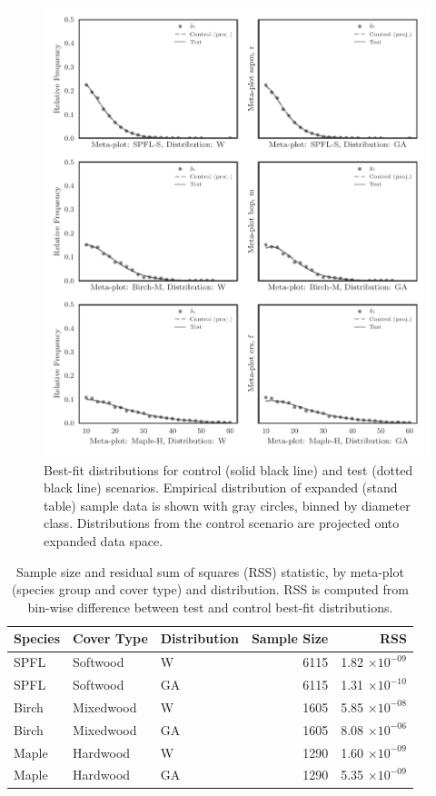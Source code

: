 \documentclass{foresj}
\begin{document}
\clearpage

\begin{figure}[h!]
  \centering
  \includegraphics[width=1.0\textwidth]{results}
  \caption{Best-fit distributions for control (solid black line) and test (dotted black line) scenarios. Empirical distribution of expanded (stand table) sample data is shown with gray circles, binned by diameter class. Distributions from the control scenario are projected onto expanded data space.}
  \label{fig:results}
\end{figure}

\begin{table}[h!]
\caption{Sample size and residual sum of squares (RSS) statistic, by meta-plot
  (species group and cover type) and distribution. RSS is computed from bin-wise difference between test and control best-fit distributions.}
\vspace{1em}
\label{tab:results}
\centering
\begin{tabular}{lllrr}
\toprule
  Species & Cover Type & Distribution &  Sample Size &           RSS \\
  \midrule
  SPFL &   Softwood &  W &       6115 &  1.82 $\times 10^{-09}$ \\
  SPFL &   Softwood &  GA &       6115 &  1.31 $\times 10^{-10}$ \\
  Birch &  Mixedwood &   W &      1605 &  5.85 $\times 10^{-08}$ \\
  Birch &  Mixedwood &     GA &    1605 &  8.08 $\times 10^{-06}$  \\
  Maple &   Hardwood &      W &   1290 &  1.60 $\times 10^{-09}$ \\
  Maple &   Hardwood &      GA &   1290 &  5.35 $\times 10^{-09}$ \\
\bottomrule
\end{tabular}
\end{table}
\end{document}
